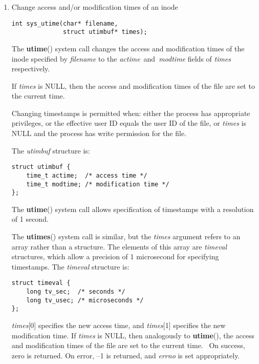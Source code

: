 \documentclass[twoside]{article}
\begin{document}
\begin{multicols}{2}
\begin{enumerate}
On successfully sleeping for the requested interval,
{\bf nanosleep}{\rm ()}
returns 0.
If the call is interrupted by a signal handler or encounters an error,
then it returns --1, with
{\it errno}
set to indicate the error.

\item
Change access and/or modification times of an inode
{\footnotesize
\begin{lstlisting}
int sys_utime(char* filename, 
              struct utimbuf* times);
\end{lstlisting}
\par}

The
{\bf utime}{\rm ()}
system call
changes the access and modification times of the inode specified by
{\it filename}
to the
{\it actime}{\rm \ and\ }{\it modtime}
fields of
{\it times}
respectively.

If
{\it times}
is NULL, then the access and modification times of the file are set
to the current time.

Changing timestamps is permitted when: either
the process has appropriate privileges,
or the effective user ID equals the user ID
of the file, or
{\it times}
is NULL and the process has write permission for the file.

The
{\it utimbuf}
structure is:

{\footnotesize
\begin{lstlisting}
struct utimbuf {
    time_t actime;  /* access time */
    time_t modtime; /* modification time */
};
\end{lstlisting}
\par}

The
{\bf utime}{\rm ()}
system call
allows specification of timestamps with a resolution of 1 second.

The
{\bf utimes}{\rm ()}
system call
is similar, but the
{\it times}
argument refers to an array rather than a structure.
The elements of this array are
{\it timeval}
structures, which allow a precision of 1 microsecond for specifying timestamps.
The
{\it timeval}
structure is:

{\footnotesize
\begin{lstlisting}
struct timeval {
    long tv_sec;  /* seconds */
    long tv_usec; /* microseconds */
};
\end{lstlisting}
\par}

{\it times}{\rm [0]}
specifies the new access time, and
{\it times}{\rm [1]}
specifies the new modification time.
If
{\it times}
is NULL, then analogously to
{\bf utime}{\rm (),}
the access and modification times of the file are
set to the current time.
\
On success, zero is returned.
On error, --1 is returned, and
{\it errno}
is set appropriately.


\end{enumerate}
\end{multicols}
\end{document}
